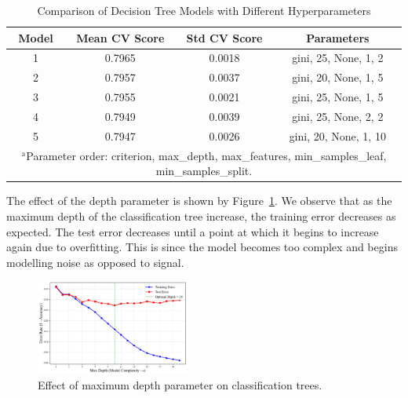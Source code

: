 \documentclass[10pt, conference]{IEEEtran}
\begin{document}
\begin{table}[htbp]
	\caption{Comparison of Decision Tree Models with Different Hyperparameters}
	\begin{center}
		\begin{tabular}{|c|c|c|c|}
			\hline
			\textbf{Model} & \textbf{Mean CV Score} & \textbf{Std CV Score} & \textbf{Parameters} \\
			\hline
			1 & 0.7965 & 0.0018 & gini, 25, None, 1, 2 \\ \hline
			2 & 0.7957 & 0.0037 & gini, 20, None, 1, 5 \\ \hline
			3 & 0.7955 & 0.0021 & gini, 25, None, 1, 5 \\ \hline
			4 & 0.7949 & 0.0039 & gini, 25, None, 2, 2 \\ \hline
			5 & 0.7947 & 0.0026 & gini, 20, None, 1, 10 \\ \hline
			\multicolumn{4}{p{0.95\linewidth}}{%
				$^{\mathrm{a}}$Parameter order: criterion, max\_depth, max\_features, min\_samples\_leaf, min\_samples\_split.%
			} 
		\end{tabular}
		\label{tab:dt_comparison}
	\end{center}
\end{table}

The effect of the depth parameter is shown by Figure~\ref{fig:dt-perf}. We observe that as the maximum depth of the classification tree increase, the training error decreases as expected. The test error decreases until a point at which it begins to increase again due to overfitting. This is since the model becomes too complex and begins modelling noise as opposed to signal.


\begin{figure}[h]
	\centering
	\includegraphics[width=0.45\textwidth]{../plots/dt_training_vs_test_error.pdf}
	\caption{Effect of maximum depth parameter on classification trees.}
	\label{fig:dt-perf}
\end{figure}
\end{document}
